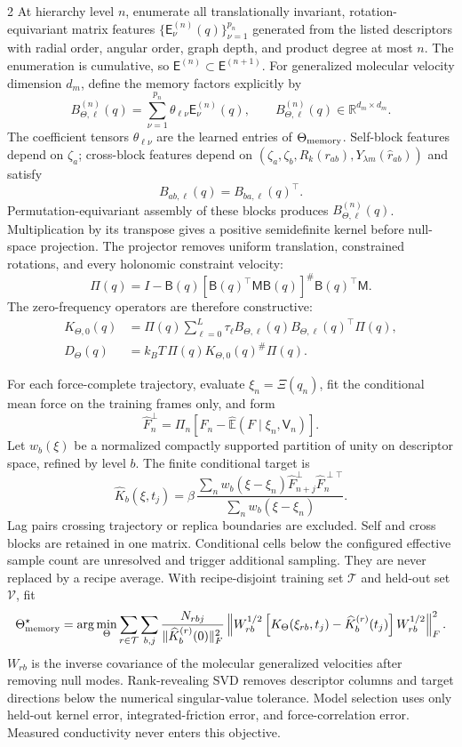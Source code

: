\documentclass[10pt]{article}
\newcommand{\pinv}{^{\#}}
\begin{document}
\begin{multicols}{2}
At hierarchy level \(n\), enumerate all translationally invariant,
rotation-equivariant matrix features
\(\{\mathsf E_\nu^{(n)}(q)\}_{\nu=1}^{p_n}\) generated from the listed
descriptors with radial order, angular order, graph depth, and product degree at
most \(n\).  The enumeration is cumulative, so
\(\mathsf E^{(n)}\subset\mathsf E^{(n+1)}\).  For generalized molecular velocity
dimension \(d_m\), define the memory factors explicitly by
\[
B_{\Theta,\ell}^{(n)}(q)
=\sum_{\nu=1}^{p_n}\theta_{\ell\nu}\mathsf E_\nu^{(n)}(q),
\qquad
B_{\Theta,\ell}^{(n)}(q)\in\mathbb R^{d_m\times d_m}.
\]
The coefficient tensors \(\theta_{\ell\nu}\) are the learned entries of
\(\Theta_{\rm memory}\).  Self-block features depend on \(\zeta_a\); cross-block
features depend on
\((\zeta_a,\zeta_b,R_k(r_{ab}),Y_{\lambda m}(\widehat r_{ab}))\) and satisfy
\[
B_{ab,\ell}(q)=B_{ba,\ell}(q)^\top.
\]
Permutation-equivariant assembly of these blocks produces
\(B_{\Theta,\ell}^{(n)}(q)\).  Multiplication by its transpose gives a positive
semidefinite kernel before null-space projection.
The projector removes uniform translation, constrained rotations, and every
holonomic constraint velocity:
\[
\Pi(q)=I-\mathsf B(q)
\left[\mathsf B(q)^\top\mathsf M\mathsf B(q)\right]\pinv
\mathsf B(q)^\top\mathsf M.
\]
The zero-frequency operators are therefore constructive:
\[
\boxed{\begin{aligned}
K_{\Theta,0}(q)
&=\Pi(q)\sum_{\ell=0}^{L}
\tau_\ell B_{\Theta,\ell}(q)B_{\Theta,\ell}(q)^\top\Pi(q),\\
D_\Theta(q)&=k_BT\,\Pi(q)K_{\Theta,0}(q)\pinv\Pi(q).
\end{aligned}}
\]

For each force-complete trajectory, evaluate \(\xi_n=\Xi(q_n)\), fit the
conditional mean force on the training frames only, and form
\[
\widehat F_n^\perp
=\Pi_n\left[F_n-\widehat{\mathbb E}(F\mid\xi_n,\mathsf V_n)\right].
\]
Let \(w_b(\xi)\) be a normalized compactly supported partition of unity on descriptor
space, refined by level \(b\). The finite conditional target is
\[
\boxed{
\widehat K_b(\xi,t_j)=
\beta\,
\frac{\sum_n w_b(\xi-\xi_n)
\widehat F_{n+j}^\perp\widehat F_n^{\perp\top}}
{\sum_n w_b(\xi-\xi_n)}.}
\]
Lag pairs crossing trajectory or replica boundaries are excluded. Self and cross
blocks are retained in one matrix. Conditional cells below the configured effective
sample count are unresolved and trigger additional sampling. They are never replaced
by a recipe average. With recipe-disjoint training
set \(\mathcal T\) and held-out set \(\mathcal V\), fit
\[
\Theta_{\rm memory}^\star
=\arg\min_\Theta
\sum_{r\in\mathcal T}\sum_{b,j}
\frac{N_{rbj}}{\|\widehat K_b^{(r)}(0)\|_F^2}
\left\|
W_{rb}^{1/2}
\left[K_\Theta(\xi_{rb},t_j)-\widehat K_b^{(r)}(t_j)\right]
W_{rb}^{1/2}
\right\|_F^2 .
\]
\(W_{rb}\) is the inverse covariance of the molecular generalized velocities after
removing null modes.  Rank-revealing SVD removes descriptor columns and target
directions below the numerical singular-value tolerance.  Model selection uses
only held-out kernel error, integrated-friction error, and force-correlation error.
Measured conductivity never enters this objective.


\end{multicols}
\end{document}
